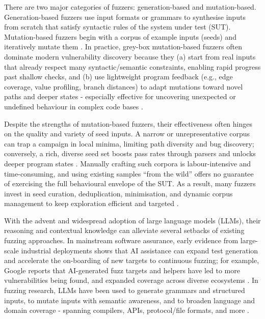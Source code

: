 There are two major categories of fuzzers: generation-based and mutation-based. Generation-based fuzzers use input formats or grammars to synthesise inputs from scratch that satisfy syntactic rules of the system under test (SUT). Mutation-based fuzzers begin with a corpus of example inputs (seeds) and iteratively mutate them \cite{mans_2021_the}. In practice, grey-box mutation-based fuzzers often dominate modern vulnerability discovery because they (a) start from real inputs that already respect many syntactic/semantic constraints, enabling rapid progress past shallow checks, and (b) use lightweight program feedback (e.g., edge coverage, value profiling, branch distances) to adapt mutations toward novel paths and deeper states - especially effective for uncovering unexpected or undefined behaviour in complex code bases \cite{mans_2021_the,wang_2020_a}.

Despite the strengths of mutation-based fuzzers, their effectiveness often hinges on the quality and variety of seed inputs. A narrow or unrepresentative corpus can trap a campaign in local minima, limiting path diversity and bug discovery; conversely, a rich, diverse seed set boosts pass rates through parsers and unlocks deeper program states \cite{yu_2024_fuzzing}. Manually crafting such corpora is labour-intensive and time-consuming, and using existing samples ``from the wild'' offers no guarantee of exercising the full behavioural envelope of the SUT. As a result, many fuzzers invest in seed curation, deduplication, minimisation, and dynamic corpus management to keep exploration efficient and targeted \cite{wang_2020_a}.

With the advent and widespread adoption of large language models (LLMs), their reasoning and contextual knowledge can alleviate several setbacks of existing fuzzing approaches. In mainstream software assurance, early evidence from large-scale industrial deployments shows that AI assistance can expand test generation and accelerate the on-boarding of new targets to continuous fuzzing; for example, Google reports that AI-generated fuzz targets and helpers have led to more vulnerabilities being found, and expanded coverage across diverse ecosystems \cite{googlesecurityblog_2024_leveling,googlesecurityblog_2024_scaling}. In fuzzing research, LLMs have been used to generate grammars and structured inputs, to mutate inputs with semantic awareness, and to broaden language and domain coverage - spanning compilers, APIs, protocol/file formats, and more \cite{xia_2023_universal,yang_2023_whitebox,chen_2025_elfuzz,wang_2020_a}.

